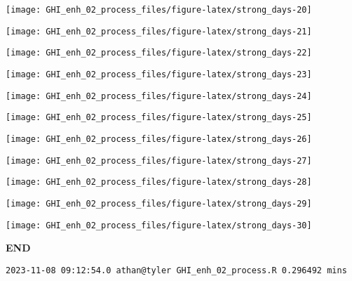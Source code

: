 \documentclass[
  10pt,
  a4paper,oneside]{article}
\begin{document}
\begin{center}\texttt{[image: GHI\_enh\_02\_process\_files/figure-latex/strong\_days-20]} \end{center}

\begin{center}\texttt{[image: GHI\_enh\_02\_process\_files/figure-latex/strong\_days-21]} \end{center}

\begin{center}\texttt{[image: GHI\_enh\_02\_process\_files/figure-latex/strong\_days-22]} \end{center}

\begin{center}\texttt{[image: GHI\_enh\_02\_process\_files/figure-latex/strong\_days-23]} \end{center}

\begin{center}\texttt{[image: GHI\_enh\_02\_process\_files/figure-latex/strong\_days-24]} \end{center}

\begin{center}\texttt{[image: GHI\_enh\_02\_process\_files/figure-latex/strong\_days-25]} \end{center}

\begin{center}\texttt{[image: GHI\_enh\_02\_process\_files/figure-latex/strong\_days-26]} \end{center}

\begin{center}\texttt{[image: GHI\_enh\_02\_process\_files/figure-latex/strong\_days-27]} \end{center}

\begin{center}\texttt{[image: GHI\_enh\_02\_process\_files/figure-latex/strong\_days-28]} \end{center}

\begin{center}\texttt{[image: GHI\_enh\_02\_process\_files/figure-latex/strong\_days-29]} \end{center}

\begin{center}\texttt{[image: GHI\_enh\_02\_process\_files/figure-latex/strong\_days-30]} \end{center}

\textbf{END}

\begin{verbatim}
2023-11-08 09:12:54.0 athan@tyler GHI_enh_02_process.R 0.296492 mins
\end{verbatim}
\end{document}
